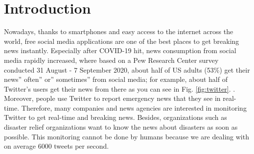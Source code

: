 \documentclass[sigconf]{acmart}
\begin{document}



\maketitle

\section{Introduction}
Nowadays, thanks to smartphones and easy access to the internet across the world, free social media applications are one of the best places to get breaking news instantly. Especially after COVID-19 hit, news consumption from social media rapidly increased, where based on a Pew Research Center survey conducted 31 August - 7 September 2020, about half of US adults (53\%) get their news” often” or” sometimes” from social media; for example, about half of Twitter’s users get their news from there as you can see in Fig. \ref{fig:twitter}. \cite{shearer2021news}. Moreover, people use Twitter to report emergency news that they see in real-time. Therefore, many companies and news agencies are interested in monitoring Twitter to get real-time and breaking news. Besides, organizations such as disaster relief organizations want to know the news about disasters as soon as possible. This monitoring cannot be done by humans because we are dealing with on average 6000 \cite{numTweet} tweets per second. 
\end{document}
